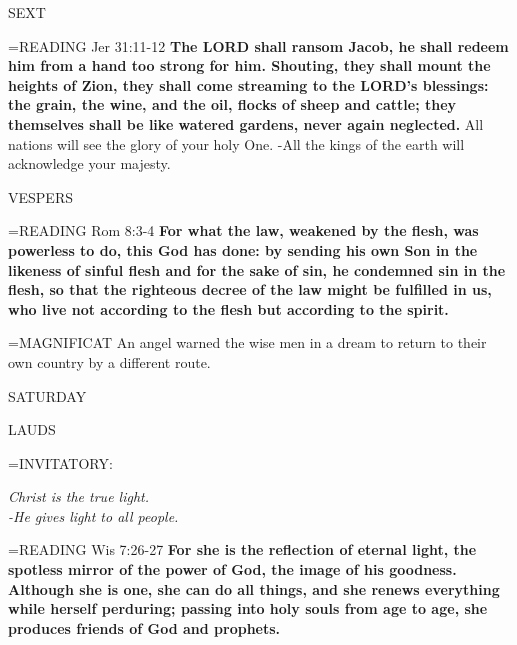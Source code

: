 \begin{flushleft}\normalsize SEXT\\\end{flushleft}
\hangindent=\parindent \small{READING}   Jer 31:11-12 \textbf{  The LORD shall ransom Jacob, he shall redeem him from a hand too strong for him. Shouting, they shall mount the heights of Zion, they shall come streaming to the LORD’s blessings: the grain, the wine, and the oil, flocks of sheep and cattle; they themselves shall be like watered gardens, never again neglected.}
All nations will see the glory of your holy One.
-All the kings of the earth will acknowledge your majesty.

\begin{flushleft}\normalsize VESPERS\\\end{flushleft}
\hangindent=\parindent \small{READING}   Rom 8:3-4 \textbf{  For what the law, weakened by the flesh, was powerless to do, this God has done: by sending his own Son in the likeness of sinful flesh and for the sake of sin, he condemned sin in the flesh, so that the righteous decree of the law might be fulfilled in us, who live not according to the flesh but according to the spirit.\\}

\hangindent=\parindent \small{MAGNIFICAT 	An angel warned the wise men in a dream to return to their own country by a different route.\\}

\begin{center}
\normalsize SATURDAY
\end{center}

\begin{flushleft}\normalsize LAUDS\\\end{flushleft}
\hangindent=\parindent \small{INVITATORY:}
\begin{center}
\textit{Christ is the true light.\\}
\textit{-He gives light to all people.\\}
\end{center}

\hangindent=\parindent \small{READING}   Wis 7:26-27 \textbf{  For she is the reflection of eternal light, the spotless mirror of the power of God, the image of his goodness. Although she is one, she can do all things, and she renews everything while herself perduring; passing into holy souls from age to age, she produces friends of God and prophets.\\}

